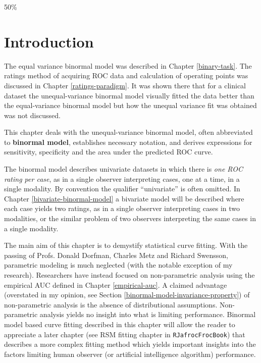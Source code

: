 \documentclass[
]{book}
\begin{document}
50\%

\hypertarget{binormal-model-introduction}{%
\section{Introduction}\label{binormal-model-introduction}}

The equal variance binormal model was described in Chapter \ref{binary-task}. The ratings method of acquiring ROC data and calculation of operating points was discussed in Chapter \ref{ratings-paradigm}. It was shown there that for a clinical dataset the unequal-variance binormal model visually fitted the data better than the equal-variance binormal model but how the unequal variance fit was obtained was not discussed.

This chapter deals with the unequal-variance binormal model, often abbreviated to \textbf{binormal model}, establishes necessary notation, and derives expressions for sensitivity, specificity and the area under the predicted ROC curve.

The binormal model describes univariate datasets in which there is \emph{one ROC rating per case}, as in a single observer interpreting cases, one at a time, in a single modality. By convention the qualifier ``univariate'' is often omitted. In Chapter \ref{bivariate-binormal-model} a bivariate model will be described where each case yields two ratings, as in a single observer interpreting cases in two modalities, or the similar problem of two observers interpreting the same cases in a single modality.

The main aim of this chapter is to demystify statistical curve fitting. With the passing of Profs. Donald Dorfman, Charles Metz and Richard Swensson, parametric modeling is much neglected (with the notable exception of my research). Researchers have instead focused on non-parametric analysis using the empirical AUC defined in Chapter \ref{empirical-auc}. A claimed advantage (overstated in my opinion, see Section \ref{binormal-model-invariance-property}) of non-parametric analysis is the absence of distributional assumptions. Non-parametric analysis yields no insight into what is limiting performance. Binormal model based curve fitting described in this chapter will allow the reader to appreciate a later chapter (see RSM fitting chapter in \texttt{RJafrocFrocBook}) that describes a more complex fitting method which yields important insights into the factors limiting human observer (or artificial intelligence algorithm) performance.
\end{document}
